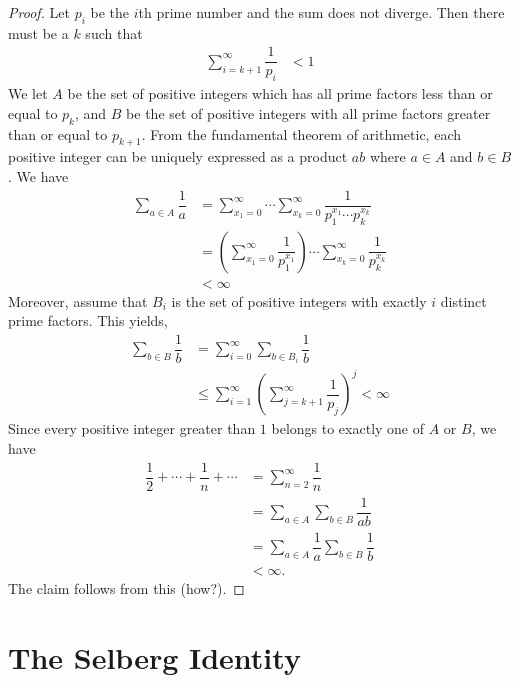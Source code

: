 	\begin{proof}
		Let $p_i$ be the $i$th prime number and the sum does not diverge. Then there must be a $k$ such that
			\begin{align*}
				\sum_{i=k+1}^{\infty}\dfrac{1}{p_i} & < 1
			\end{align*}
		We let $A$ be the set of positive integers which has all prime factors less than or equal to $p_k$, and $B$ be the set of positive integers with all prime factors greater than or equal to $p_{k+1}$. From the fundamental theorem of arithmetic, each positive integer can be uniquely expressed as a product $ab$ where $a\in A$ and $b\in B$. We have
			\begin{align*}
				\sum_{a\in A}\dfrac{1}{a}
					& = 
					\sum_{x_1=0}^{\infty}\cdots\sum_{x_k=0}^{\infty}\dfrac{1}{p_1^{x_1}\cdots p_k^{x_k}}\\
					& =
					\left(\sum_{x_1=0}^{\infty}\dfrac{1}{p_1^{x_1}}\right)\cdots\sum_{x_k=0}^{\infty}\dfrac{1}{p_k^{x_k}}\\
					& < \infty
			\end{align*}
		Moreover, assume that $B_i$ is the set of positive integers with exactly $i$ distinct prime factors. This yields,
			\begin{align*}
				\sum_{b\in B}\dfrac{1}{b}
					& =
					\sum_{i=0}^{\infty}\sum_{b\in B_i}\dfrac{1}{b}\\
					& \leq \sum_{i=1}^{\infty}\left(\sum_{j=k+1}^{\infty}\dfrac{1}{p_{j}}\right)^j<\infty
			\end{align*}
		Since every positive integer greater than $1$ belongs to exactly one of $A$ or $B$, we have
			\begin{align*}
				\dfrac{1}{2}+\cdots+\dfrac{1}{n}+\cdots
					& = \sum_{n=2}^{\infty}\dfrac{1}{n}\\
					& = \sum_{a\in A}\sum_{b\in B}\dfrac{1}{ab}\\
					& = \sum_{a\in A}\dfrac{1}{a}\sum_{b\in B}\dfrac{1}{b}\\
					& < \infty.
			\end{align*}
		The claim follows from this (how?).
		
	\end{proof}
	
\section{The Selberg Identity}
	
